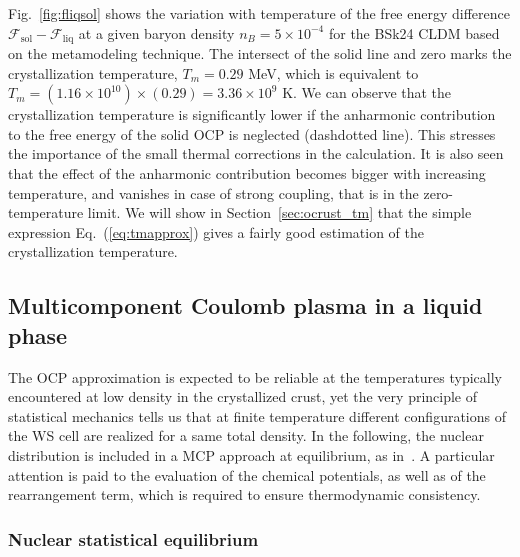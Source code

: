 Fig.~\ref{fig:fliqsol} shows the variation with temperature of the free energy
difference $\mathcal{F}_{\text{sol}}-\mathcal{F}_{\text{liq}}$ at a given
baryon density $n_B = 5\times 10^{-4}$ for the BSk24 CLDM based on the 
metamodeling technique. The intersect of the solid line and zero marks
the crystallization temperature, $T_m = 0.29$ MeV, which is equivalent to $T_m
= (1.16\times 10^{10}) \times (0.29) = 3.36 \times 10^9$ K. We can observe that
the crystallization temperature is significantly lower if the 
anharmonic contribution to the free energy of the solid OCP is neglected 
(dashdotted line). This stresses the importance of the small thermal
corrections in the calculation. It is also seen that the effect of the 
anharmonic contribution becomes bigger with increasing temperature, and 
vanishes in case of strong coupling, that is in the zero-temperature limit. We
will show in Section~\ref{sec:ocrust_tm} that the simple expression 
Eq.~(\ref{eq:tmapprox}) gives a fairly good estimation of the 
crystallization temperature.

\subsection{Multicomponent Coulomb plasma in a liquid phase}\label{subsec:mcp}

The OCP approximation is expected to be reliable at the temperatures
typically encountered at low density in the crystallized crust, yet the 
very principle of statistical mechanics tells us that at finite temperature 
different configurations of the WS cell are realized for a same total density.
In the following, the nuclear distribution is included in a MCP approach at 
equilibrium, as in~\cite{Fantina2020,Carreau2020}. A 
particular attention is paid to the evaluation of the chemical potentials, as 
well as of the rearrangement term, which is required to ensure thermodynamic 
consistency. 

\subsubsection{Nuclear statistical equilibrium}

